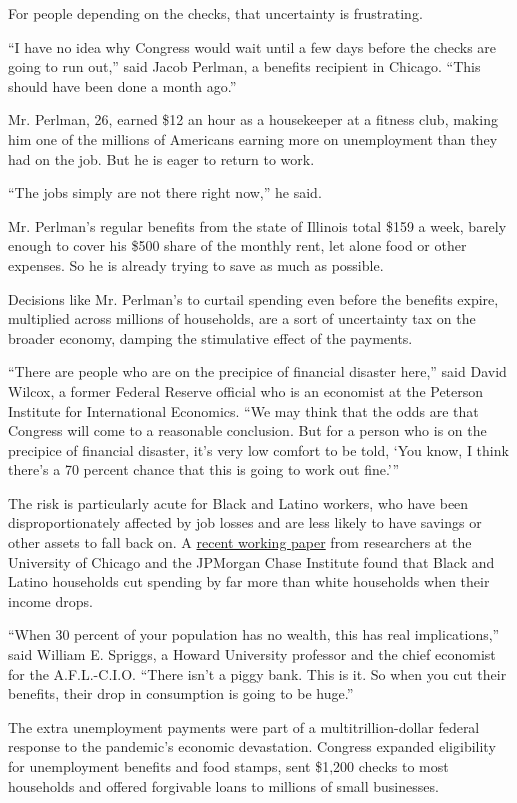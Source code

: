 For people depending on the checks, that uncertainty is frustrating.

``I have no idea why Congress would wait until a few days before the
checks are going to run out,'' said Jacob Perlman, a benefits recipient
in Chicago. ``This should have been done a month ago.''

Mr. Perlman, 26, earned \$12 an hour as a housekeeper at a fitness club,
making him one of the millions of Americans earning more on unemployment
than they had on the job. But he is eager to return to work.

``The jobs simply are not there right now,'' he said.

Mr. Perlman's regular benefits from the state of Illinois total \$159 a
week, barely enough to cover his \$500 share of the monthly rent, let
alone food or other expenses. So he is already trying to save as much as
possible.

Decisions like Mr. Perlman's to curtail spending even before the
benefits expire, multiplied across millions of households, are a sort of
uncertainty tax on the broader economy, damping the stimulative effect
of the payments.

``There are people who are on the precipice of financial disaster
here,'' said David Wilcox, a former Federal Reserve official who is an
economist at the Peterson Institute for International Economics. ``We
may think that the odds are that Congress will come to a reasonable
conclusion. But for a person who is on the precipice of financial
disaster, it's very low comfort to be told, `You know, I think there's a
70 percent chance that this is going to work out fine.'''

The risk is particularly acute for Black and Latino workers, who have
been disproportionately affected by job losses and are less likely to
have savings or other assets to fall back on. A
\href{https://www.nber.org/papers/w27552}{recent working paper} from
researchers at the University of Chicago and the JPMorgan Chase
Institute found that Black and Latino households cut spending by far
more than white households when their income drops.

``When 30 percent of your population has no wealth, this has real
implications,'' said William E. Spriggs, a Howard University professor
and the chief economist for the A.F.L.-C.I.O. ``There isn't a piggy
bank. This is it. So when you cut their benefits, their drop in
consumption is going to be huge.''

The extra unemployment payments were part of a multitrillion-dollar
federal response to the pandemic's economic devastation. Congress
expanded eligibility for unemployment benefits and food stamps, sent
\$1,200 checks to most households and offered forgivable loans to
millions of small businesses.

